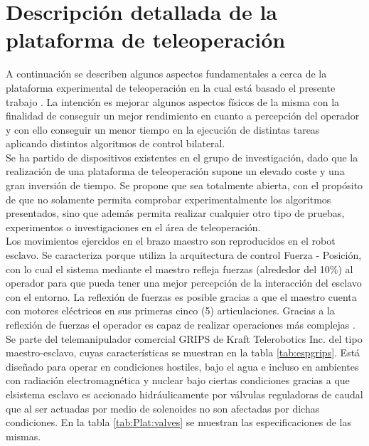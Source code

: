\newpage
\section{Descripción detallada de la plataforma de teleoperaci\'on}

A continuación se describen algunos aspectos fundamentales a cerca de la plataforma experimental de teleoperación en la cual está basado el presente trabajo \cite{Galiana2012}. La intenci\'on es mejorar algunos aspectos físicos de la misma con la finalidad de conseguir un mejor rendimiento en cuanto a percepción del operador y con ello conseguir un menor tiempo en la ejecución de distintas tareas aplicando distintos algoritmos de control bilateral.\\

Se ha partido de dispositivos existentes en el grupo de investigación, dado que la realización de una plataforma de teleoperación supone un elevado coste y una gran inversión de tiempo. Se propone que sea totalmente abierta, con el propósito de que no solamente permita comprobar experimentalmente los algoritmos presentados, sino que adem\'as permita realizar cualquier otro tipo de pruebas, experimentos o investigaciones en el área de teleoperación.\\

Los movimientos ejercidos en el brazo maestro son reproducidos en el robot esclavo. Se caracteriza porque utiliza la arquitectura de control Fuerza - Posición, con lo cual el sistema mediante el maestro refleja fuerzas (alrededor del 10\%) al operador para que pueda tener una mejor percepción de la interacción del esclavo con el entorno. La reflexión de fuerzas es posible gracias a que el maestro cuenta con motores eléctricos en sus primeras cinco (5) articulaciones. Gracias a la reflexión de fuerzas el operador es capaz de realizar operaciones más complejas \cite{Ming1989,Hannaford1991}.\\


Se parte  del telemanipulador comercial GRIPS de Kraft Telerobotics Inc. del tipo maestro-esclavo, cuyas características se muestran en la tabla \ref{tab:espgrips}. Est\'a diseñado para operar en condiciones hostiles, bajo el agua e incluso en ambientes con radiación electromagnética y  nuclear bajo ciertas condiciones gracias a que elsistema esclavo es accionado hidráulicamente por válvulas reguladoras de caudal que al ser actuadas por medio de solenoides no son afectadas por dichas condiciones. En la tabla  \ref{tab:Plat:valves} se muestran las especificaciones de las mismas.


